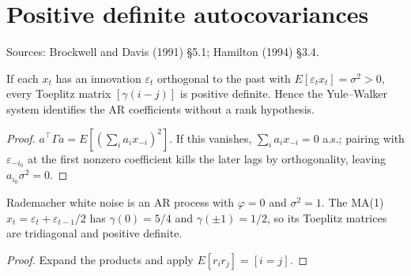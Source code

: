 \section{Positive definite autocovariances}
\label{sec:toeplitz-pd}

Sources: Brockwell and Davis (1991) \S5.1; Hamilton (1994) \S3.4.

\begin{theorem}
\label{thm:toeplitz-pd}
\leanok
{}
If each $x_t$ has an innovation $\varepsilon_t$ orthogonal to the past with $E[\varepsilon_tx_t] = \sigma^2 > 0$, every
Toeplitz matrix $[\gamma(i-j)]$ is positive definite. Hence the Yule--Walker system identifies the AR coefficients without
a rank hypothesis.
\end{theorem}
\begin{proof}
\leanok
$a^\top\Gamma a = E[(\sum_ia_ix_{-i})^2]$. If this vanishes, $\sum_ia_ix_{-i} = 0$ a.s.; pairing with
$\varepsilon_{-i_0}$ at the first nonzero coefficient kills the later lags by orthogonality, leaving $a_{i_0}\sigma^2 = 0$.
\end{proof}

\begin{theorem}
\label{thm:toeplitz-witness}
\leanok
{}
Rademacher white noise is an AR process with $\varphi = 0$ and $\sigma^2 = 1$. The MA(1)
$x_t = \varepsilon_t + \varepsilon_{t-1}/2$ has $\gamma(0) = 5/4$ and $\gamma(\pm1) = 1/2$, so its Toeplitz matrices are
tridiagonal and positive definite.
\end{theorem}
\begin{proof}
\leanok
Expand the products and apply $E[r_ir_j] = [i=j]$.
\end{proof}
